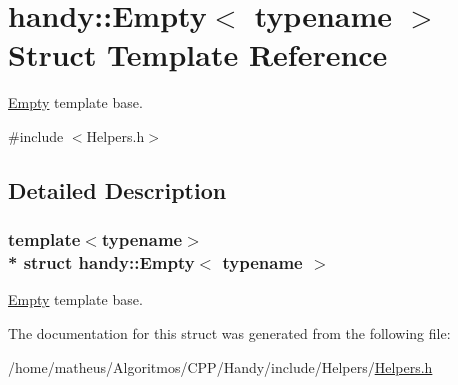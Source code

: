 \hypertarget{structhandy_1_1Empty}{}\section{handy\+:\+:Empty$<$ typename $>$ Struct Template Reference}
\label{structhandy_1_1Empty}


\hyperlink{structhandy_1_1Empty}{Empty} template base.  




{\ttfamily \#include $<$Helpers.\+h$>$}



\subsection{Detailed Description}
\subsubsection*{template$<$typename$>$\\*
struct handy\+::\+Empty$<$ typename $>$}

\hyperlink{structhandy_1_1Empty}{Empty} template base. 

The documentation for this struct was generated from the following file\+:\begin{DoxyCompactItemize}
\item 
/home/matheus/\+Algoritmos/\+C\+P\+P/\+Handy/include/\+Helpers/\hyperlink{Helpers_2Helpers_8h}{Helpers.\+h}\end{DoxyCompactItemize}
